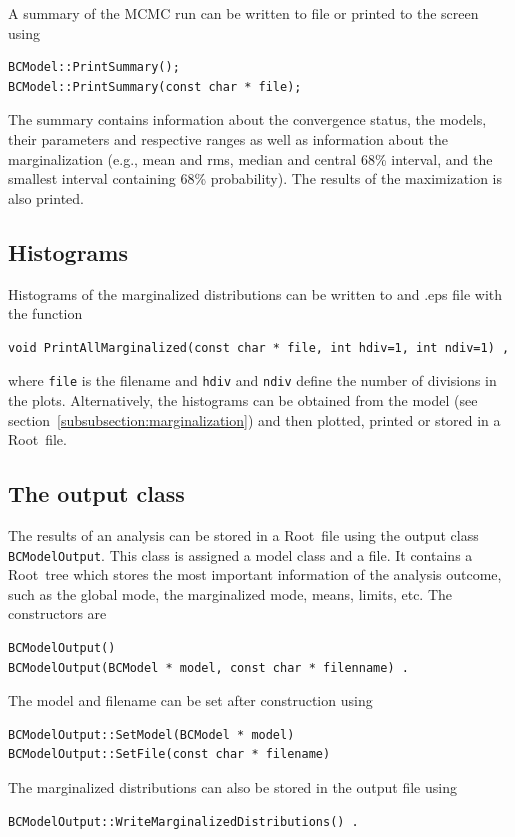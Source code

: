 \documentclass[11pt, a4paper]{article}
\newcommand{\Root}{{\sc Root}}
\begin{document}
A summary of the MCMC run can be written to file or printed to the
screen using 
%
\begin{verbatim}
BCModel::PrintSummary(); 
BCModel::PrintSummary(const char * file); 
\end{verbatim}

The summary contains information about the convergence status, the
models, their parameters and respective ranges as well as information
about the marginalization (e.g., mean and rms, median and central 68\%
interval, and the smallest interval containing 68\% probability). The
results of the maximization is also printed.


\subsection{Histograms}

Histograms of the marginalized distributions can be written to and
.eps file with the function
%
\begin{verbatim}
void PrintAllMarginalized(const char * file, int hdiv=1, int ndiv=1) ,
\end{verbatim}
%
\noindent 
where \verb|file| is the filename and \verb|hdiv| and \verb|ndiv|
define the number of divisions in the plots. Alternatively, the
histograms can be obtained from the model (see
section~\ref{subsubsection:marginalization}) and then plotted, printed
or stored in a \Root\ file.


\subsection{The output class}

The results of an analysis can be stored in a \Root\ file using the
output class \verb|BCModelOutput|. This class is assigned a model
class and a file. It contains a \Root\ tree which stores the most
important information of the analysis outcome, such as the global
mode, the marginalized mode, means, limits, etc. The constructors are
%
\begin{verbatim}
BCModelOutput() 
BCModelOutput(BCModel * model, const char * filenname) .
\end{verbatim}
%
The model and filename can be set after construction using 
%
\begin{verbatim}
BCModelOutput::SetModel(BCModel * model) 
BCModelOutput::SetFile(const char * filename) 
\end{verbatim}
%
The marginalized distributions can also be stored in the output file
using
%
\begin{verbatim}
BCModelOutput::WriteMarginalizedDistributions() . 
\end{verbatim}
\end{document}
